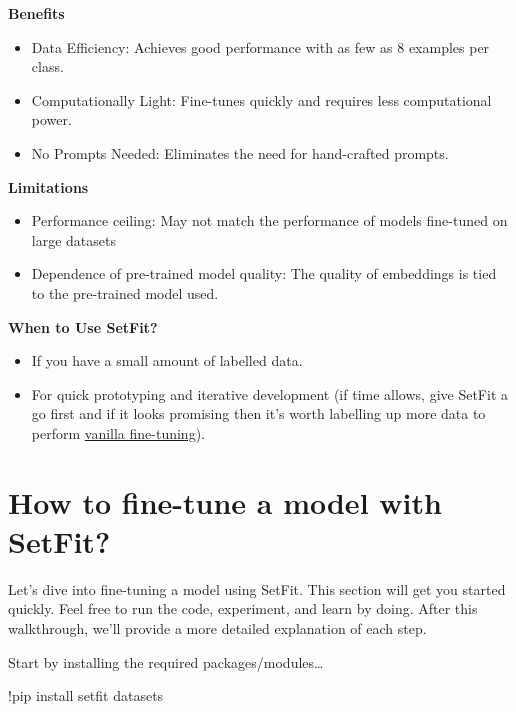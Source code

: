 \documentclass[
  letterpaper,
  DIV=11,
  numbers=noendperiod]{scrreprt}
\newenvironment{Shaded}{\begin{snugshade}}{\end{snugshade}}
\newcommand{\NormalTok}[1]{\textcolor[rgb]{0.00,0.23,0.31}{#1}}
\newcommand{\OperatorTok}[1]{\textcolor[rgb]{0.37,0.37,0.37}{#1}}
\providecommand{\tightlist}{%
  \setlength{\itemsep}{0pt}\setlength{\parskip}{0pt}}\usepackage{longtable,booktabs,array}
\begin{document}
\textbf{Benefits}

\begin{itemize}
\tightlist
\item
  Data Efficiency: Achieves good performance with as few as 8 examples
  per class.
\item
  Computationally Light: Fine-tunes quickly and requires less
  computational power.
\item
  No Prompts Needed: Eliminates the need for hand-crafted prompts.
\end{itemize}

\textbf{Limitations}

\begin{itemize}
\tightlist
\item
  Performance ceiling: May not match the performance of models
  fine-tuned on large datasets
\item
  Dependence of pre-trained model quality: The quality of embeddings is
  tied to the pre-trained model used.
\end{itemize}

\textbf{When to Use SetFit?}

\begin{itemize}
\tightlist
\item
  If you have a small amount of labelled data.
\item
  For quick prototyping and iterative development (if time allows, give
  SetFit a go first and if it looks promising then it's worth labelling
  up more data to perform \href{./vanilla_finetuning.qmd}{vanilla
  fine-tuning}).
\end{itemize}

\section{How to fine-tune a model with
SetFit?}\label{how-to-fine-tune-a-model-with-setfit}

Let's dive into fine-tuning a model using SetFit. This section will get
you started quickly. Feel free to run the code, experiment, and learn by
doing. After this walkthrough, we'll provide a more detailed explanation
of each step.

Start by installing the required packages/modules\ldots{}

\begin{Shaded}
\begin{Highlighting}[]
\OperatorTok{!}\NormalTok{pip install setfit datasets}
\end{Highlighting}
\end{Shaded}
\end{document}
